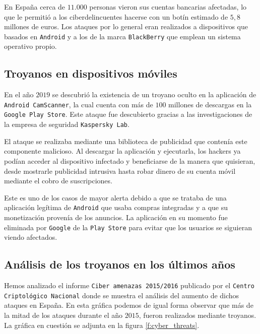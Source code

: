 \documentclass[12pt]{article}
\newcommand{\newpar} {
    \vskip 0.5cm
}
\begin{document}
            \newpar

            En España cerca de $11.000$ personas vieron sus cuentas bancarias afectadas, lo que le permitió a los ciberdelincuentes hacerse con un botín estimado de $5,8$ millones de euros. Los ataques por lo general eran realizados a dispositivos que basados en \texttt{Android} y a los de la marca \texttt{BlackBerry} que emplean un sistema operativo propio.

        \subsection{Troyanos en dispositivos móviles}
            En el año $2019$ se descubrió la existencia de un troyano oculto en la aplicación de \texttt{Android CamScanner}, la cual cuenta con más de $100$ millones de descargas en la \texttt{Google Play Store}. Este ataque fue descubierto gracias a las investigaciones de la empresa de seguridad \texttt{Kaspersky Lab}.

            \newpar

            El ataque se realizaba mediante una biblioteca de publicidad que contenía este componente malicioso. Al descargar la aplicación y ejecutarla, los hackers ya podían acceder al dispositivo infectado y beneficiarse de la manera que quisieran, desde mostrarle publicidad intrusiva hasta robar dinero de su cuenta móvil mediante el cobro de suscripciones.

            \newpar

            Este es uno de los casos de mayor alerta debido a que se trataba de una aplicación legítima de \texttt{Android} que usaba compras integradas y a que su monetización provenía de los anuncios. La aplicación en su momento fue eliminada por \texttt{Google} de la \texttt{Play Store} para evitar que los usuarios se siguieran viendo afectados.

        \subsection{Análisis de los troyanos en los últimos años}
            Hemos analizado el informe \texttt{Ciber amenazas 2015/2016} publicado por el \texttt{Centro Criptológico Nacional} donde se muestra el análisis del aumento de dichos ataques en España. En esta gráfica podemos de igual forma observar que más de la mitad de los ataques durante el año $2015$, fueron realizados mediante troyanos. La gráfica en cuestión se adjunta en la figura \ref{f:cyber_threats}.
\end{document}
